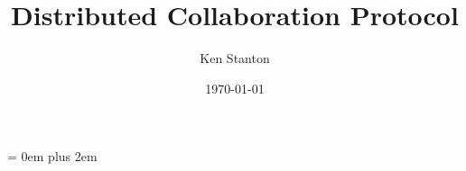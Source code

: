 \documentclass[10pt]{article}
\newcommand{\myedge}{\rightskip = 0em plus 2em}
\begin{document}
\title{Distributed Collaboration Protocol}
\author{Ken Stanton}
\date{\today}
\maketitle

\myedge

\setcounter{tocdepth}{1}
\tableofcontents
\newpage

\end{document}
